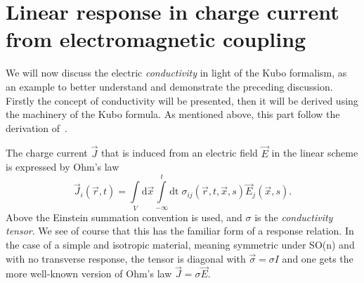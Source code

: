 \section[Charge response from electromagnetic coupling]{Linear response in charge current from electromagnetic coupling}
We will now discuss the electric \emph{conductivity} in light of the Kubo formalism, as an example to better understand and demonstrate the preceding discussion.
Firstly the concept of conductivity will be presented, then it will be derived using the machinery of the Kubo formula.
As mentioned above, this part follow the derivation of~\textcite{mahanManyparticlePhysics2000}.

The charge current $\vec{J}$ that is induced from an electric field $\vec{E}$ in the linear scheme is expressed by Ohm's law
\begin{equation}
  \label{eq:ohm}
  \vec{J}_i(\vec{r}, t) =
  \int\limits_{V} \mathrm{d} \vec{x} \!\int\limits_{-\infty}^t \mathrm{dt} \;
  \sigma_{ij}(\vec{r}, t, \vec{x}, s)
  \vec{E}_j(\vec{x}, s).
\end{equation}
Above the Einstein summation convention is used, and $\sigma$ is the \emph{conductivity tensor}.
We see of course that this has the familiar form of a response relation.
In the case of a simple and isotropic material, meaning symmetric under SO(n) and with no transverse response, the tensor is diagonal with $\vec{\sigma} = \sigma I$ and one gets the more well-known version of Ohm's law $\vec{J} = \sigma \vec{E}$.

